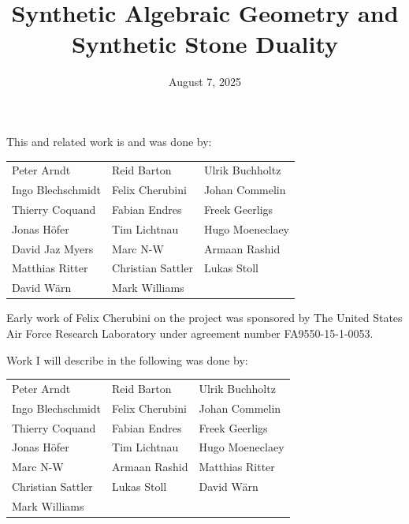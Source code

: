 \documentclass{beamer}
\title{Synthetic Algebraic Geometry and Synthetic Stone Duality}
\date{August 7, 2025}
\newcommand{\nop}[1]{\textcolor{bg}{#1}}
\begin{document}
\begin{frame}
  \titlepage
\end{frame}

\begin{frame}
  This and related work is and was done by:
  \begin{center}
    \begin{tabularx}{\textwidth}{XXX}
      Peter Arndt & Reid Barton & Ulrik Buchholtz \\
      Ingo Blechschmidt & Felix Cherubini & Johan Commelin \\
      Thierry Coquand & Fabian Endres & Freek Geerligs \\
      Jonas Höfer & Tim Lichtnau & Hugo Moeneclaey \\
      David Jaz Myers & Marc N-W & Armaan Rashid \\ 
      Matthias Ritter & Christian Sattler & Lukas Stoll \\
      David Wärn & Mark Williams &
    \end{tabularx}
  \end{center}
  \pause
  Early work of Felix Cherubini on the project was sponsored by The United States Air Force Research Laboratory under agreement number FA9550-15-1-0053.
\end{frame}

\begin{frame}
  Work I will describe in the following was done by:
  \begin{center}
    \begin{tabularx}{\textwidth}{XXX}
      \nop{Peter Arndt} & \nop{Reid Barton} & \nop{Ulrik Buchholtz} \\
      Ingo Blechschmidt & Felix Cherubini & \nop{Johan Commelin} \\
      Thierry Coquand & \nop{Fabian Endres} & Freek Geerligs \\
      \nop{Jonas Höfer} & \nop{Tim Lichtnau} & Hugo Moeneclaey \\
      \nop{Marc N-W} & Armaan Rashid & Matthias Ritter \\ 
      \nop{Christian Sattler} & \nop{Lukas Stoll} & David Wärn \\
      \nop{Mark Williams} & &
    \end{tabularx}
  \end{center}
\end{frame}
\end{document}
